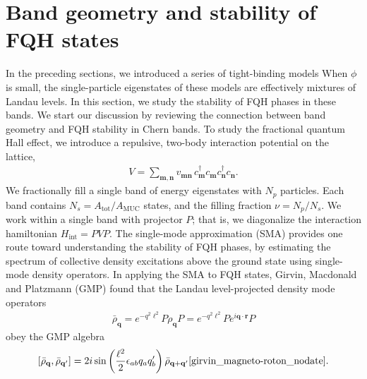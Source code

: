 \documentclass[aps,prb,twocolumn,letterpaper,twoside,nobalancelastpage,groupedaddress,amsmath,amssymb,floatfix,citeautoscript]{revtex4-1}
\begin{document}

\section{Band geometry and stability of FQH states}
In the preceding sections, we introduced a series of tight-binding models When $\phi$ is small, the single-particle eigenstates of these models are effectively mixtures of Landau levels. In this section, we study the stability of FQH phases in these bands. We start our discussion by reviewing the connection between band geometry and FQH stability in Chern bands.
To study the fractional quantum Hall effect, we introduce a repulsive, two-body interaction potential on the lattice,
\begin{align}
V = \sum_{\mathbf{m},\mathbf{n}}v_{\mathbf{m}\mathbf{n}}\, c^{\dag}_\mathbf{m} c_\mathbf{m} c^{\dag}_\mathbf{n} c_\mathbf{n}.
\end{align}
We fractionally fill a single band of energy eigenstates with $N_p$ particles. Each band contains $N_s = A_{\text{tot}}/A_{\text{MUC}}$ states, and the filling fraction $\nu = N_p /N_s$. We work within a single band with projector $P$; that is, we diagonalize the interaction hamiltonian $H_{\text{int}} = PVP$. 
The single-mode approximation (SMA) provides one route toward understanding the stability of FQH phases, by estimating the spectrum of collective density excitations above the ground state\cite{girvin_magneto-roton_nodate} using single-mode density operators. In applying the SMA to FQH states, Girvin, Macdonald and Platzmann (GMP) found that the Landau level-projected density mode operators
\begin{align}
\bar{\rho}_\mathbf{q} = e^{-q^2\ell^2}P\rho_\mathbf{q}P = e^{-q^2\ell^2}Pe^{i\mathbf{q}\cdot \mathbf{r}}P
\end{align}
 obey the GMP algebra
\begin{align}
\comm{\bar{\rho}_{\mathbf{q}}}{\bar{\rho}_{\mathbf{q}'}} = 2i\sin\left(\frac{\ell^2}{2}\epsilon_{ab}q_a q'_b\right)\bar{\rho}_{\mathbf{q} +\mathbf{q}'}\cite{girvin_magneto-roton_nodate}.
\end{align}
\end{document}
